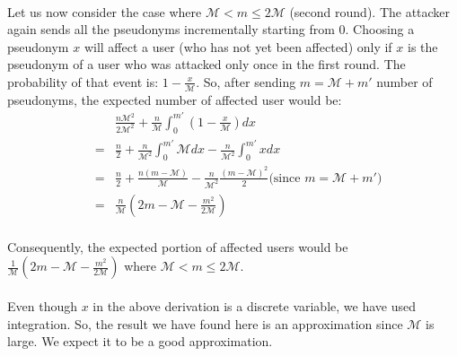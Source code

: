 \documentclass{llncs} %
\begin{document}
\begin{subappendices}
\paragraph{} Let us now consider the case where $\mathcal{M} < m \leq 2\mathcal{M}$ (second round). The attacker again sends all the pseudonyms incrementally starting from $0$. Choosing a pseudonym $x$ will affect a user (who has not yet been affected) only if $x$ is the pseudonym of a user who was attacked only once in the first round. The probability of that event is: $1 - \frac{x}{\mathcal{M}}$. So, after sending $m = \mathcal{M} + m'$ number of pseudonyms, the expected number of affected user would be:
\begin{eqnarray*}
 & & \frac{n\mathcal{M}^2}{2\mathcal{M}^2} + \frac{n}{\mathcal{M}} \int_{0}^{m'}\left(1 - \frac{x}{\mathcal{M}} \right)dx \\
 &=& \frac{n}{2} + \frac{n}{\mathcal{M}^2} \int_{0}^{m'} \mathcal{M} dx  - \frac{n}{\mathcal{M}^2} \int_{0}^{m'} x dx \\
  &=& \frac{n}{2} + \frac{n\left( m - \mathcal{M} \right)}{\mathcal{M}} - \frac{n}{\mathcal{M}^2} \frac{\left( m - \mathcal{M} \right)^2}{2} \text{(since }  m = \mathcal{M} + m' \text{)}\\
    &=& \frac{n}{\mathcal{M}} \left( 2m - \mathcal{M} - \frac{m^2}{2\mathcal{M}} \right) \\
\end{eqnarray*}

Consequently, the expected portion of affected users would be $\frac{1}{\mathcal{M}} \left( 2m - \mathcal{M} - \frac{m^2}{2\mathcal{M}} \right)$ where $\mathcal{M} < m \leq 2\mathcal{M}$.

\paragraph{} Even though $x$ in the above derivation is a discrete variable, we have used integration. So, the result we have found here is an approximation since $\mathcal{M}$ is large. We expect it to be a good approximation.


\end{subappendices}
\end{document}
